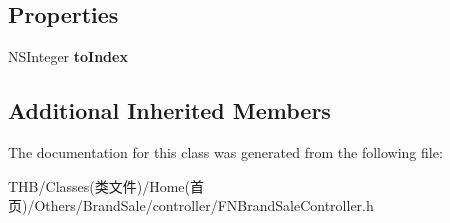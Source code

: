 \subsection*{Properties}
\begin{DoxyCompactItemize}
\item 
\mbox{\label{interface_f_n_brand_sale_controller_a9694d7c4bb87a008c8af2419387b4195}} 
N\+S\+Integer {\bfseries to\+Index}
\end{DoxyCompactItemize}
\subsection*{Additional Inherited Members}


The documentation for this class was generated from the following file\+:\begin{DoxyCompactItemize}
\item 
T\+H\+B/\+Classes(类文件)/\+Home(首页)/\+Others/\+Brand\+Sale/controller/F\+N\+Brand\+Sale\+Controller.\+h\end{DoxyCompactItemize}
